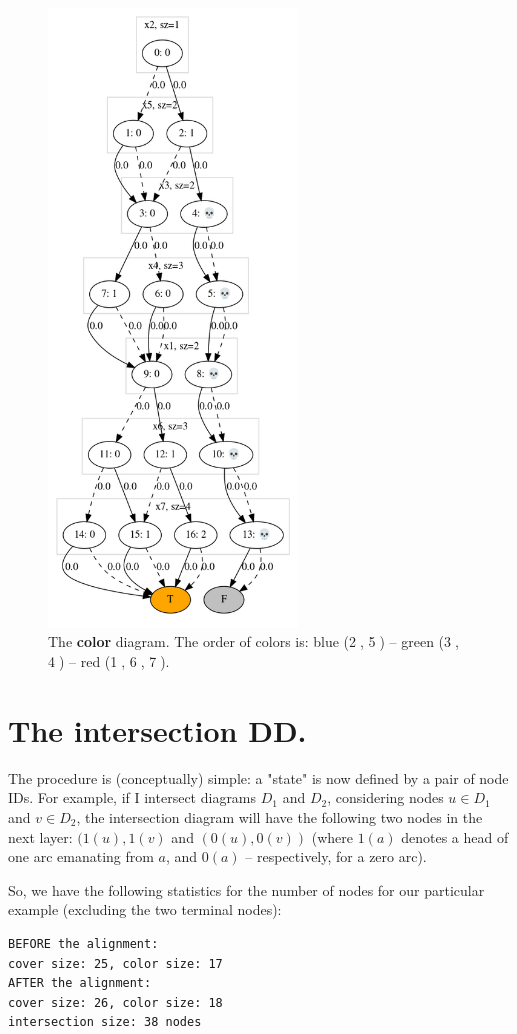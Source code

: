 \documentclass[11pt]{article}
\begin{document}
\begin{figure}[htbp]
\centering
\includegraphics[width=250px]{./color.png}
\caption{\label{fig:color}The \textbf{color} diagram. The order of colors is: blue (\textcircled{2}, \textcircled{5}) -- green (\textcircled{3}, \textcircled{4}) -- red (\textcircled{1}, \textcircled{6}, \textcircled{7}).}
\end{figure}

\section{The intersection DD.}
\label{sec:orgdea801b}
The procedure is (conceptually) simple: a "state" is now defined by a pair of
node IDs. For example, if I intersect diagrams \(D_1\) and \(D_2\), considering
nodes \(u\in D_1\) and \(v\in D_2\), the intersection diagram will have the
following two nodes in the next layer: \((1(u), 1(v)\) and \((0(u), 0(v))\) (where
\(1(a)\) denotes a head of one arc emanating from \(a\), and \(0(a)\) --
respectively, for a zero arc).

So, we have the following statistics for the number of nodes for our
particular example (excluding the two terminal nodes):
\begin{verbatim}
BEFORE the alignment:
cover size: 25, color size: 17
AFTER the alignment:
cover size: 26, color size: 18
intersection size: 38 nodes
\end{verbatim}
\end{document}
